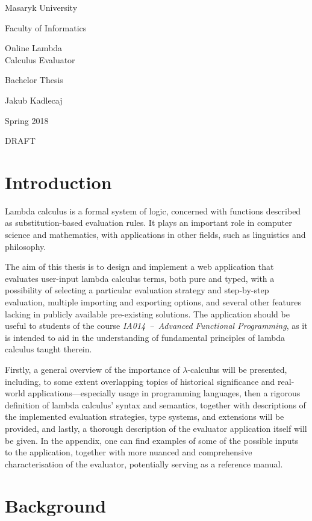 \documentclass[a4paper,10pt]{article}
\begin{document}
Masaryk University

Faculty of Informatics

{\Huge 
Online Lambda\\Calculus Evaluator
}

Bachelor Thesis

Jakub Kadlecaj

Spring 2018

DRAFT

\newpage
\tableofcontents
\newpage

\section{Introduction}

Lambda calculus is a formal system of logic, concerned with functions described as
substitution-based evaluation rules. It plays an important role in computer science
and mathematics, with applications in other fields, such as linguistics 
and philosophy.

The aim of this thesis is to design and implement a web application that evaluates
user-input lambda calculus terms, both pure and typed, with a possibility of
selecting a particular evaluation strategy and step-by-step evaluation, 
multiple importing and exporting options, and several other features lacking 
in publicly available pre-existing solutions. The application should be useful to students of
the course \textit{IA014~--~Advanced Functional Programming}, as it is intended to aid in the understanding
of fundamental principles of lambda calculus taught therein.

Firstly, a general overview of the importance of $\lambda$-calculus will be presented,
including, to some extent overlapping topics of historical significance 
and real-world applications---especially usage in
programming languages, then a rigorous definition of lambda calculus' syntax and semantics, together with
descriptions of the implemented evaluation strategies, type systems, and extensions will be provided,
and lastly, a thorough description of the evaluator application itself will be given. In the appendix,
one can find examples of some of the possible inputs to the application, together with more
nuanced and comprehensive characterisation of the evaluator, potentially serving as a reference manual.
\newpage

\section{Background}
\end{document}
